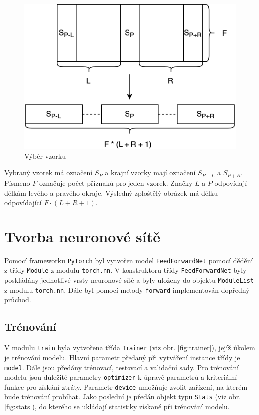 \documentclass[FM,BP]{tulthesis}
\begin{document}
\begin{figure}[ht]
\centerline{\includegraphics[scale=.22]{sample_selection.png}}
\caption{Výběr vzorku}
\label{fig:sample_selection}
\end{figure}
\FloatBarrier

Vybraný vzorek má označení $ S_{P} $ a krajní vzorky mají označení $ S_{P-L} $ a $ S_{P+R} $. Písmeno $ F $ označuje počet příznaků pro jeden vzorek. Značky $ L $ a $ P $ odpovídají délkám levého a pravého okraje. Výsledný zploštělý obrázek má délku odpovídající $ F \cdot (L + R + 1) $.

\section{Tvorba neuronové sítě} %
Pomocí frameworku \texttt{\mbox{PyTorch}} byl vytvořen model \texttt{\mbox{FeedForwardNet}} pomocí dědění z třídy \texttt{\mbox{Module}} z modulu \texttt{\mbox{torch.nn}}. V konstruktoru třídy \texttt{\mbox{FeedForwardNet}} byly poskládány jednotlivé vrsty neuronové sítě a byly uloženy do objektu \texttt{\mbox{ModuleList}} z modulu \texttt{\mbox{torch.nn}}. Dále byl pomocí metody \texttt{\mbox{forward}} implementován dopředný průchod.

\subsection{Trénování} %
V modulu \texttt{\mbox{train}} byla vytvořena třída \texttt{\mbox{Trainer}} (viz obr. \mbox{\ref{fig:trainer}}), jejíž úkolem je trénování modelu. Hlavní parametr předaný při vytváření instance třídy je \texttt{\mbox{model}}. Dále jsou předány trénovací, testovací a validační sady. Pro trénování modelu jsou důležité parametry \texttt{\mbox{optimizer}} k úpravě parametrů a kriteriální funkce pro získání ztráty. Parametr \texttt{\mbox{device}} umožňuje zvolit zařízení, na kterém bude trénování probíhat. Jako poslední je předán objekt typu \texttt{\mbox{Stats}} (viz obr. \mbox{\ref{fig:stats}}), do kterého se ukládají statistiky získané při trénování modelu. 
\end{document}
